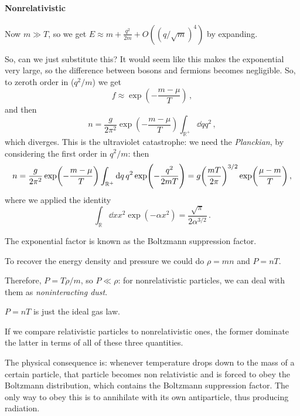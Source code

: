 \documentclass[main.tex]{subfiles}
\begin{document}
\paragraph{Nonrelativistic}

Now \(m \gg T\), so we get \(E \approx m + \frac{q^2}{2m} + O((q/\sqrt{m})^{4})\) by expanding.

So, can we just substitute this? It would seem like this makes the exponential very large, so the difference between bosons and fermions becomes negligible. So, to zeroth order in (\(q^2/m\)) we get 
%
\begin{equation}
  f \approx \exp(-\frac{m- \mu }{T}) 
\,,
\end{equation}
%
and then 
%
\begin{equation}
  n = \frac{g}{2 \pi^2} \exp(-\frac{m- \mu }{T}) \int _{\mathbb{R}^{+}} \dd{q}q^2 
\,,
\end{equation}
%
which diverges. This is the ultraviolet catastrophe: we need the \emph{Planckian}, by considering the first order in \(q^2/m\): then
%
\begin{equation}
    n = \frac{g}{2 \pi^2} \exp(-\frac{m- \mu }{T}) \int _{\mathbb{R}^{+}} \dd{q}q^2 \exp(-\frac{q^2}{2mT}) 
    = g \qty(\frac{mT}{2 \pi })^{3/2} \exp(\frac{\mu - m}{T}) 
  \,,
\end{equation}
where we applied the identity 
%
\begin{equation}
  \int _{\mathbb{R}} \dd{x} x^2 \exp(-\alpha x^2) = \frac{\sqrt{\pi } }{2 \alpha^{3/2}} 
\,.
\end{equation}
%

The exponential factor is known as the Boltzmann suppression factor.

To recover the energy density and pressure we could do \(\rho = m n\) and \(P = n T\). 


Therefore, \(P = T \rho / m\), so \(P \ll \rho \): for nonrelativistic particles, we can deal with them as \emph{noninteracting dust}.

\(P = nT\) is just the ideal gas law.

If we compare relativistic particles to nonrelativistic ones, the former dominate the latter in terms of all of these three quantities.

The physical consequence is: whenever temperature drops down to the mass of a certain particle, that particle becomes non relativistic and is forced to obey the Boltzmann distribution, which contains the Boltzmann suppression factor. The only way to obey this is to annihilate with its own antiparticle, thus producing radiation.
\end{document}
